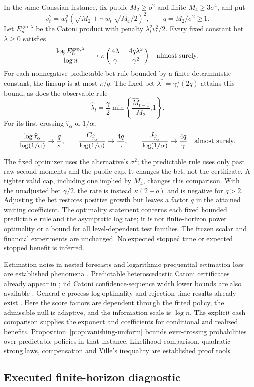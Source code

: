 \begin{proposition}
\label{prop:vanishing-geometry-bet}
In the same Gaussian instance, fix public $M_2\ge\sigma^2$ and finite
$M_4\ge3\sigma^4$, and put
\[
 v_t^2=w_t^2(\sqrt{M_2}+\gamma|w_t|\sqrt{M_4}/2)^2,
 \qquad q=M_2/\sigma^2\ge1.
\]
Let $E_n^{\mathrm{geo},\lambda}$ be the Catoni product with penalty
$\lambda_t^2v_t^2/2$. Every fixed constant bet $\lambda\ge0$ satisfies
\begin{equation}
 \frac{\log E_n^{\mathrm{geo},\lambda}}{\log n}
 \longrightarrow\kappa\left(\frac{4\lambda}{\gamma}
                  -\frac{4q\lambda^2}{\gamma^2}\right)
 \quad\hbox{almost surely}.
 \label{eq:geometry-bet-rate}
\end{equation}
For each nonnegative predictable bet rule bounded by a finite deterministic
constant, the limsup is at most $\kappa/q$. The fixed bet
$\lambda^*=\gamma/(2q)$ attains this bound, as does the observable rule
\begin{equation}
 \widehat\lambda_t=\frac\gamma2
       \min\!\left\{\frac{\widehat M_{t-1}}{M_2},1\right\}.
 \label{eq:geometry-bet-plugin}
\end{equation}
For its first crossing $\widehat\tau_\alpha$ of $1/\alpha$,
\[
 \frac{\log\widehat\tau_\alpha}{\log(1/\alpha)}\to\frac q\kappa,
 \qquad
 \frac{C_{\widehat\tau_\alpha}}{\log(1/\alpha)}\to\frac{4q}\gamma,
 \qquad
 \frac{J_{\widehat\tau_\alpha}}{\log(1/\alpha)}\to\frac{4q}\gamma
 \quad\hbox{almost surely}.
\]
\end{proposition}

The fixed optimizer uses the alternative's $\sigma^2$; the predictable rule
uses only past raw second moments and the public cap. It changes the bet,
not the certificate. A tighter valid cap, including one implied by $M_4$,
changes this comparison. With the unadjusted bet $\gamma/2$, the rate is instead
$\kappa(2-q)$ and is negative for $q>2$. Adjusting the bet restores positive
growth but leaves a factor $q$ in the attained waiting coefficient. The
optimality statement concerns each fixed bounded predictable rule and the
asymptotic log rate; it is not finite-horizon power optimality or a bound for
all level-dependent test families. The frozen scalar and financial experiments
are unchanged. No expected stopped time or expected stopped benefit is inferred.

Estimation noise in nested forecasts and logarithmic prequential estimation
loss are established phenomena \cite{clarkmccracken,clarkwest,prequential}.
Predictable heteroscedastic Catoni certificates already appear in
\cite[Section~9]{wr}; iid Catoni confidence-sequence width lower bounds are
also available \cite{bhattwidth}.
General e-process log-optimality and rejection-time results already exist
\cite{instance}. Here the score factors are dependent through the fitted
policy, the admissible null is adaptive, and the information scale is
$\log n$. The explicit cash comparison supplies the exponent and coefficients
for conditional and realized benefits. Proposition~\ref{prop:vanishing-uniform}
bounds ever-crossing probabilities over predictable policies in that instance.
Likelihood comparison, quadratic strong laws, compensation and Ville's
inequality are established proof tools.

\subsection{Executed finite-horizon diagnostic}

